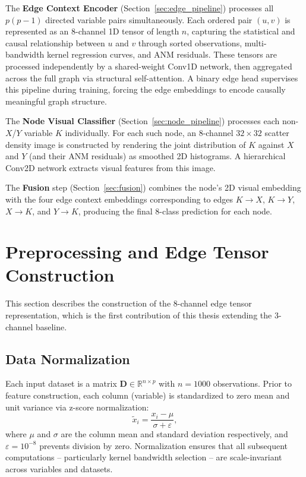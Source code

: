 The \textbf{Edge Context Encoder} (Section~\ref{sec:edge_pipeline}) processes all $p(p-1)$ directed variable pairs simultaneously. Each ordered pair $(u, v)$ is represented as an 8-channel 1D tensor of length $n$, capturing the statistical and causal relationship between $u$ and $v$ through sorted observations, multi-bandwidth kernel regression curves, and ANM residuals. These tensors are processed independently by a shared-weight Conv1D network, then aggregated across the full graph via structural self-attention. A binary edge head supervises this pipeline during training, forcing the edge embeddings to encode causally meaningful graph structure.

The \textbf{Node Visual Classifier} (Section~\ref{sec:node_pipeline}) processes each non-$X$/$Y$ variable $K$ individually. For each such node, an 8-channel $32 \times 32$ scatter density image is constructed by rendering the joint distribution of $K$ against $X$ and $Y$ (and their ANM residuals) as smoothed 2D histograms. A hierarchical Conv2D network extracts visual features from this image.

The \textbf{Fusion} step (Section~\ref{sec:fusion}) combines the node's 2D visual embedding with the four edge context embeddings corresponding to edges $K \to X$, $K \to Y$, $X \to K$, and $Y \to K$, producing the final 8-class prediction for each node.



\section{Preprocessing and Edge Tensor Construction}
\label{sec:preprocessing}

This section describes the construction of the 8-channel edge tensor representation, which is the first contribution of this thesis extending the 3-channel baseline.

\subsection{Data Normalization}

Each input dataset is a matrix $\mathbf{D} \in \mathbb{R}^{n \times p}$ with $n = 1000$ observations. Prior to feature construction, each column (variable) is standardized to zero mean and unit variance via z-score normalization:
\begin{equation}
\tilde{x}_i = \frac{x_i - \mu}{\sigma + \varepsilon},
\label{eq:zscore}
\end{equation}
where $\mu$ and $\sigma$ are the column mean and standard deviation respectively, and $\varepsilon = 10^{-8}$ prevents division by zero. Normalization ensures that all subsequent computations -- particularly kernel bandwidth selection -- are scale-invariant across variables and datasets.

